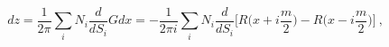 \begin{equation}
dz=\frac{1}{2\pi}\sum_iN_i\frac{d}{dS_i}Gdx=-\frac{1}{2\pi i}
\sum_iN_i\frac{d}{dS_i}\Big[R\Big(x+i\frac{m}{2}\Big)
-R\Big(x-i\frac{m}{2}\Big)\Big] \ ,
\label{di}
\end{equation}

